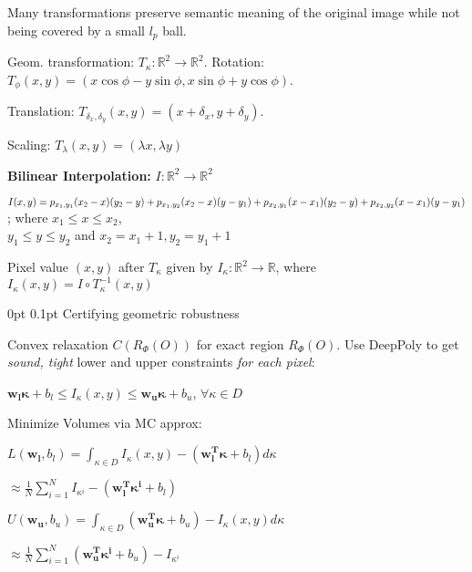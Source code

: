\documentclass[11pt,landscape,a4paper,fleqn]{article}
\makeatletter
\renewcommand{\subsection}{\@startsection{subsection}{1}{0mm}%
                                {0pt}%
                                {0.1pt}%
                            	{\color{myorange2}\sffamily\small}}
\makeatother
\begin{document}
\begin{multicols*}{4}
Many transformations preserve semantic meaning of the original image while not being covered by a small $l_p$ ball.

Geom. transformation: $T_{\kappa}: \mathbb{R}^2 \rightarrow \mathbb{R}^2$. Rotation: $T_\phi(x,y) = (x\cos \phi - y\sin \phi, x \sin \phi + y\cos \phi)$.

Translation: $T_{\delta_x, \delta_y}(x,y) = (x + \delta_x, y + \delta_y)$.

Scaling: $T_\lambda (x,y) = (\lambda x, \lambda y)$

\textbf{Bilinear Interpolation:} $I: \mathbb{R}^2 \rightarrow \mathbb{R}^2$

$I(x,y) = p_{x_1,y_1} (x_2 - x)(y_2 - y)\\ + p_{x_1,y_2}(x_2 - x)(y - y_1) + p_{x_2,y_1}(x - x_1)(y_2 - y)\\ + p_{x_2,y_2} (x - x_1)(y - y_1)$; where $x_1 \leq x \leq x_2$,\\
$y_1 \leq y \leq y_2$ and $x_2 = x_1 + 1, y_2 = y_1 + 1$
\vspace*{1mm}

Pixel value $(x,y)$ after $T_\kappa$ given by $I_\kappa : \mathbb{R}^2 \rightarrow \mathbb{R}$, where $I_\kappa(x,y) = I \circ T_\kappa^{-1}(x,y)$

\subsection{Certifying geometric robustness}

Convex relaxation $C(R_\Phi(O))$ for exact region $R_\Phi(O)$. Use DeepPoly to get \textit{sound, tight} lower and upper constraints \textit{for each pixel}:

$\mathbf{w_l}\mathbf{\kappa} + b_l \leq I_\kappa(x,y) \leq \mathbf{w_u}\mathbf{\kappa} + b_u$, $\forall \kappa \in D$

Minimize Volumes via MC approx:

$L(\mathbf{w_l}, b_l) = \int_{\kappa \in D} I_\kappa(x,y) - (\mathbf{w_l^T \kappa} + b_l) d\kappa$

\hspace*{14mm}$\approx \frac{1}{N} \sum_{i=1}^{N} I_{\kappa^i} - (\mathbf{w_l^T \kappa^i} + b_l)$

$U(\mathbf{w_u}, b_u) = \int_{\kappa \in D} (\mathbf{w_u^T \kappa} + b_u) - I_\kappa(x,y) d\kappa$

\hspace*{16mm}$\approx \frac{1}{N} \sum_{i=1}^{N} (\mathbf{w_u^T \kappa^i} + b_u) - I_{\kappa^i}$


\end{multicols*}
\end{document}

